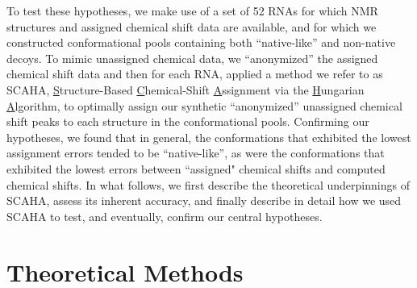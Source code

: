 \documentclass[journal=jcisd8,manuscript=article,layout=onecolumn]{achemso}
\begin{document}
To test these hypotheses, we make use of a set of 52 RNAs for which NMR structures and assigned chemical shift data are available, and for which we constructed conformational pools containing both ``native-like'' and non-native decoys. To mimic unassigned chemical data, we ``anonymized'' the assigned chemical shift data and then for each RNA, applied a method we refer to as SCAHA,  \underline{S}tructure-Based \underline{C}hemical-Shift \underline{A}ssignment via the \underline{H}ungarian \underline{A}lgorithm, to optimally assign our synthetic ``anonymized'' unassigned chemical shift peaks to each structure in the conformational pools. Confirming our hypotheses, we found that in general,  the conformations that exhibited the lowest assignment errors tended to be ``native-like'', as were the conformations that exhibited the lowest errors between ``assigned" chemical shifts and computed chemical shifts. In what follows, we first describe the theoretical underpinnings of SCAHA, assess its inherent accuracy,  and finally describe in detail how we used SCAHA to test, and eventually, confirm our central hypotheses.

\section{Theoretical Methods}
\end{document}
